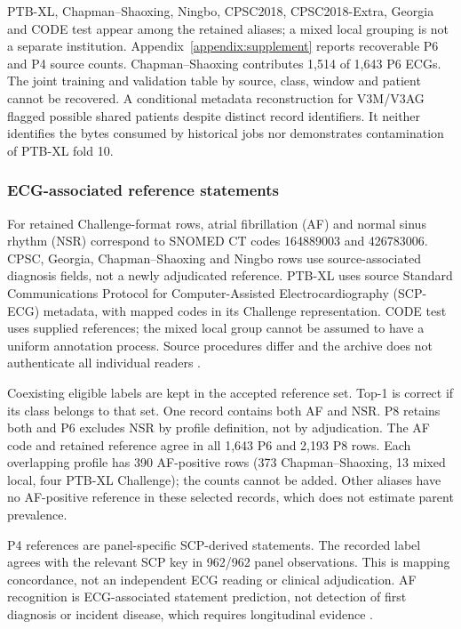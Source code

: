 \documentclass[life,article,submit,moreauthors]{Definitions/mdpi}
\begin{document}
PTB-XL, Chapman--Shaoxing, Ningbo, CPSC2018, CPSC2018-Extra, Georgia and CODE test appear among the retained aliases; a mixed local grouping is not a separate institution. Appendix~\ref{appendix:supplement} reports recoverable P6 and P4 source counts. Chapman--Shaoxing contributes 1,514 of 1,643 P6 ECGs. The joint training and validation table by source, class, window and patient cannot be recovered. A conditional metadata reconstruction for V3M/V3AG flagged possible shared patients despite distinct record identifiers. It neither identifies the bytes consumed by historical jobs nor demonstrates contamination of PTB-XL fold 10.

\subsubsection{ECG-associated reference statements}
\label{sec:af-reference}\label{sec:references}

For retained Challenge-format rows, atrial fibrillation (AF) and normal sinus rhythm (NSR) correspond to SNOMED CT codes 164889003 and 426783006. CPSC, Georgia, Chapman--Shaoxing and Ningbo rows use source-associated diagnosis fields, not a newly adjudicated reference. PTB-XL uses source Standard Communications Protocol for Computer-Assisted Electrocardiography (SCP-ECG) metadata, with mapped codes in its Challenge representation. CODE test uses supplied references; the mixed local group cannot be assumed to have a uniform annotation process. Source procedures differ and the archive does not authenticate all individual readers \citep{Reyna2022Challenge,Wagner2020PTBXL}.

Coexisting eligible labels are kept in the accepted reference set. Top-1 is correct if its class belongs to that set. One record contains both AF and NSR. P8 retains both and P6 excludes NSR by profile definition, not by adjudication. The AF code and retained reference agree in all 1,643 P6 and 2,193 P8 rows. Each overlapping profile has 390 AF-positive rows (373 Chapman--Shaoxing, 13 mixed local, four PTB-XL Challenge); the counts cannot be added. Other aliases have no AF-positive reference in these selected records, which does not estimate parent prevalence.

P4 references are panel-specific SCP-derived statements. The recorded label agrees with the relevant SCP key in 962/962 panel observations. This is mapping concordance, not an independent ECG reading or clinical adjudication. AF recognition is ECG-associated statement prediction, not detection of first diagnosis or incident disease, which requires longitudinal evidence \citep{Rossi2026AF}.
\end{document}
